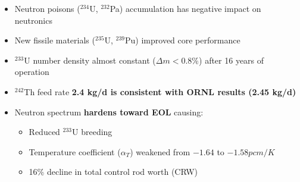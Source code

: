 \begin{frame}
\begin{textblock*}{12.8cm}
\begin{columns}
	\column[t]{4.5cm}
	\fontsize{7}{9}\selectfont
		\vspace{-3mm}
	\begin{itemize}
		\item<1-> Neutron poisons ($^{234}$U, $^{232}$Pa) accumulation has 
		negative impact on neutronics
		\item<1-> New fissile materials ($^{235}$U, $^{239}$Pu) improved core 
		performance
		\item<1-> $^{233}$U number density almost constant ($\Delta m<0.8\%$) 
		after 16 years of operation
		\item<1-> $^{242}$Th feed rate \textbf{2.4 kg/d is consistent with 
		ORNL results (2.45 kg/d) \cite{betzler_personal_2017}}
		\item<2-> Neutron spectrum \textbf{hardens toward EOL} causing:
		\begin{itemize}
			\item<3-> Reduced $^{233}$U breeding
			\item<4->Temperature coefficient ($\alpha_T$) weakened 
			from $-1.64$ to $-1.58pcm/K$
			\item<5->16\% decline in total control rod worth (CRW)
		\end{itemize} 
	\end{itemize}
\end{columns}
\end{textblock*}
\end{frame}


